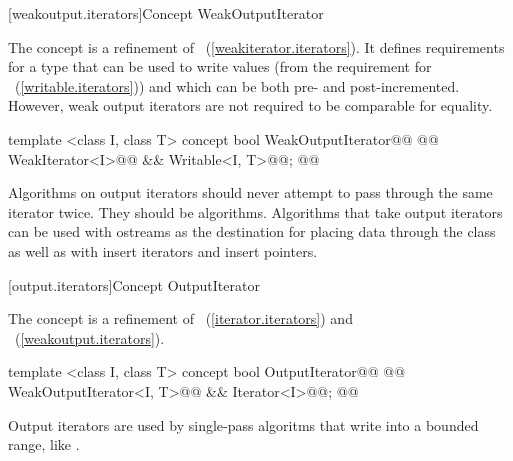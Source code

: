 
[weakoutput.iterators]{Concept WeakOutputIterator}


\begin{addedblock}
\pnum
The  concept is a refinement of
~(\ref{weakiterator.iterators}). It defines requirements for a type that
can be used to write values (from the requirement for
~(\ref{writable.iterators})) and which can be both pre- and post-incremented.
However, weak output iterators are not required to be comparable for equality.

%
\begin{codeblock}
  template <class I, class T>
  concept bool WeakOutputIterator@\newtxt{() \{}\oldtxt{ =}@
    @@ WeakIterator<I>@\newtxt{()}@ && Writable<I, T>@\newtxt{()}@;
  @\newtxt{\}}@
\end{codeblock}
\end{addedblock}

\pnum
\enternote
{}
\textit{}
Algorithms on output iterators should never attempt to pass through the same iterator twice.
They should be
algorithms.
Algorithms that take output iterators can be used with ostreams as the destination
for placing data through the
class as well as with insert iterators and insert pointers.
\exitnote

\begin{addedblock}
[output.iterators]{Concept OutputIterator}

\pnum
The  concept is a refinement of ~(\ref{iterator.iterators}) and
~(\ref{weakoutput.iterators}).

%
\begin{codeblock}
  template <class I, class T>
  concept bool OutputIterator@\newtxt{() \{}\oldtxt{ =}@
    @@ WeakOutputIterator<I, T>@\newtxt{()}@ && Iterator<I>@\newtxt{()}@;
  @\newtxt{\}}@
\end{codeblock}

\pnum
\enternote Output iterators are used by single-pass
algoritms that write into a bounded range, like .
\exitnote

\end{addedblock}

